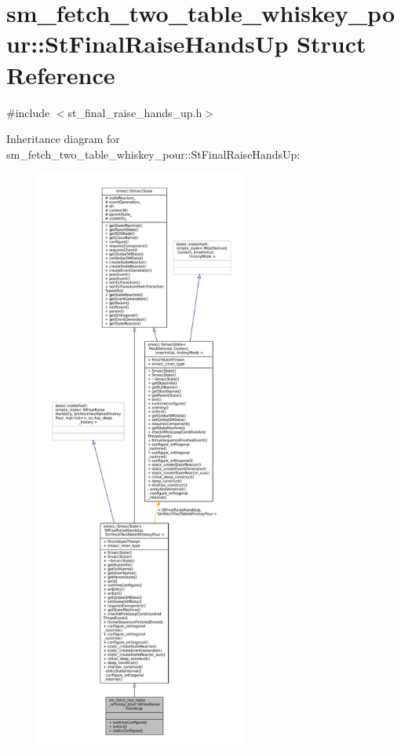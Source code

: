 \hypertarget{structsm__fetch__two__table__whiskey__pour_1_1StFinalRaiseHandsUp}{}\section{sm\+\_\+fetch\+\_\+two\+\_\+table\+\_\+whiskey\+\_\+pour\+:\+:St\+Final\+Raise\+Hands\+Up Struct Reference}
\label{structsm__fetch__two__table__whiskey__pour_1_1StFinalRaiseHandsUp}


{\ttfamily \#include $<$st\+\_\+final\+\_\+raise\+\_\+hands\+\_\+up.\+h$>$}



Inheritance diagram for sm\+\_\+fetch\+\_\+two\+\_\+table\+\_\+whiskey\+\_\+pour\+:\+:St\+Final\+Raise\+Hands\+Up\+:
\nopagebreak
\begin{figure}[H]
\begin{center}
\leavevmode
\includegraphics[height=550pt]{structsm__fetch__two__table__whiskey__pour_1_1StFinalRaiseHandsUp__inherit__graph}
\end{center}
\end{figure}


